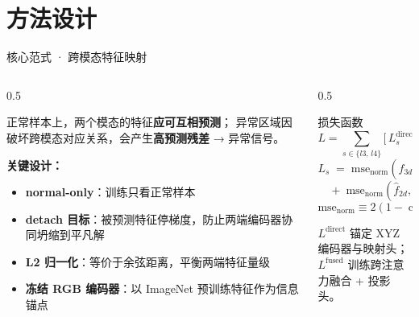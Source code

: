 \documentclass[10pt,aspectratio=43]{beamer}
\newcommand{\cmark}{\textcolor{ZJUBlue}{\ding{51}}}
\begin{document}
\section{方法设计}

\begin{frame}{核心范式 · 跨模态特征映射}
  \begin{columns}[T]
    \begin{column}{0.5\textwidth}
      \begin{hlbox}[title=核心思想]
        \small
        正常样本上，两个模态的特征\textbf{应可互相预测}；
        异常区域因破坏跨模态对应关系，会产生\textbf{高预测残差} → 异常信号。
      \end{hlbox}
      \vspace{0.4em}

      \textbf{关键设计：}
      \begin{itemize}\footnotesize
        \item[\cmark] \textbf{normal-only}：训练只看正常样本
        \item[\cmark] \textbf{detach 目标}：被预测特征停梯度，防止两端编码器协同坍缩到平凡解
        \item[\cmark] \textbf{L2 归一化}：等价于余弦距离，平衡两端特征量级
        \item[\cmark] \textbf{冻结 RGB 编码器}：以 ImageNet 预训练特征作为信息锚点
      \end{itemize}
    \end{column}
    \begin{column}{0.5\textwidth}
      \begin{block}{损失函数}
        \small
        \[
          L = \sum_{s\in\{l3,\,l4\}}\!\big[\,L^{\text{direct}}_s + 0.5\cdot L^{\text{fused}}_s\,\big]
        \]
        \[
          L_s \;=\; \mathrm{mse}_{\text{norm}}(\hat f_{3d},\,f_{3d}.\text{detach}())
        \]
        \[
          \quad+\;\mathrm{mse}_{\text{norm}}(\hat f_{2d},\,f_{2d}.\text{detach}())
        \]
        \vspace{-0.4em}
        \[
          \mathrm{mse}_{\text{norm}}\equiv 2(1-\cos\theta)
        \]
      \end{block}
      \vspace{0.2em}
      \scriptsize\color{AccentGray}
      \textbf{$L^{\text{direct}}$} 锚定 XYZ 编码器与映射头；\\
      \textbf{$L^{\text{fused}}$} 训练跨注意力融合 + 投影头。
    \end{column}
  \end{columns}
\end{frame}
\end{document}
